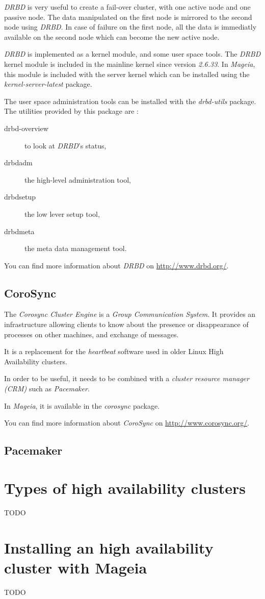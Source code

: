 \documentclass[a4paper,12pt]{article}
\begin{document}
\emph{DRBD} is very useful to create a fail-over cluster, with one
active node and one passive node. The data manipulated on the first
node is mirrored to the second node using \emph{DRBD}. In case of
failure on the first node, all the data is immediatly available on the
second node which can become the new active node.

\emph{DRBD} is implemented as a kernel module, and some user space tools.
The \emph{DRBD} kernel module is included in the mainline kernel since
version \emph{2.6.33}. In \emph{Mageia}, this module is included with
the server kernel which can be installed using the
\emph{kernel-server-latest} package.

The user space administration tools can be installed with the \emph{drbd-utils}
package. The utilities provided by this package are :
\begin{description}
\item[drbd-overview] to look at \emph{DRBD}'s status,
\item[drbdadm] the high-level administration tool,
\item[drbdsetup] the low lever setup tool,
\item[drbdmeta] the meta data management tool.
\end{description}

You can find more information about \emph{DRBD} on \url{http://www.drbd.org/}.

\subsection{CoroSync}
The \emph{Corosync Cluster Engine} is a \emph{Group Communication System}.
It provides an infrastructure allowing clients to know about the presence
or disappearance of processes on other machines, and exchange of messages.

It is a replacement for the \emph{heartbeat} software used in older
Linux High Availability clusters.

In order to be useful, it needs to be combined with a \emph{cluster
resource manager (CRM)} such as \emph{Pacemaker}.

In \emph{Mageia}, it is available in the \emph{corosync} package.

You can find more information about \emph{CoroSync} on
\url{http://www.corosync.org/}.

\subsection{Pacemaker}

\cleardoublepage
\section{Types of high availability clusters}
TODO

\cleardoublepage
\section{Installing an high availability cluster with Mageia}
TODO

\cleardoublepage
\end{document}
